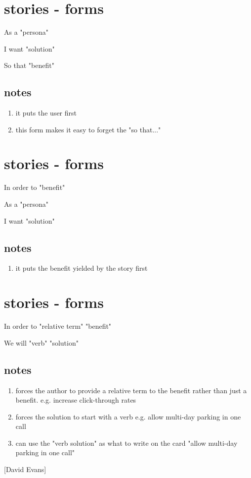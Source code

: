 \section*{stories - forms}
As a "persona"

I want "solution"

So that "benefit"

\subsection*{notes}
\begin{enumerate}
\item it puts the user first
\item this form makes it easy to forget the "so that..."
\end{enumerate}

\clearpage
\section*{stories - forms}
In order to "benefit"

As a "persona"

I want "solution"
\subsection*{notes}
\begin{enumerate}
\item it puts the benefit yielded by the story first
\end{enumerate}


\clearpage
\section*{stories - forms}
In order to "relative term" "benefit"

We will "verb" "solution"
\subsection*{notes}
\begin{enumerate}
\item forces the author to provide a relative term to the benefit rather than just a benefit. e.g. increase click-through rates
\item forces the solution to start with a verb e.g. allow multi-day parking in one call
\item can use the "verb solution" as what to write on the card "allow multi-day parking in one call"
\end{enumerate}
[David Evans]

